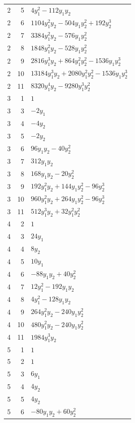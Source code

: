 \documentclass[10pt,a4paper]{article}
\begin{document}
{\begin{longtable}{rrp{125mm}}
2 & 5 & $4 y_{1}^{2} - 112 y_{1} y_{2}$\\
2 & 6 & $1104 y_{1}^{2} y_{2} - 504 y_{1} y_{2}^{2} + 192 y_{2}^{3}$\\
2 & 7 & $3384 y_{1}^{2} y_{2} - 576 y_{1} y_{2}^{2}$\\
2 & 8 & $1848 y_{1}^{2} y_{2} - 528 y_{1} y_{2}^{2}$\\
2 & 9 & $2816 y_{1}^{3} y_{2} + 864 y_{1}^{2} y_{2}^{2} - 1536 y_{1} y_{2}^{3}$\\
2 & 10 & $13184 y_{1}^{3} y_{2} + 2080 y_{1}^{2} y_{2}^{2} - 1536 y_{1} y_{2}^{3}$\\
2 & 11 & $8320 y_{1}^{4} y_{2} - 9280 y_{1}^{3} y_{2}^{2}$\\
3 & 1 & $1$\\
3 & 3 & $- 2 y_{1}$\\
3 & 4 & $- 4 y_{2}$\\
3 & 5 & $- 2 y_{2}$\\
3 & 6 & $96 y_{1} y_{2} - 40 y_{2}^{2}$\\
3 & 7 & $312 y_{1} y_{2}$\\
3 & 8 & $168 y_{1} y_{2} - 20 y_{2}^{2}$\\
3 & 9 & $192 y_{1}^{2} y_{2} + 144 y_{1} y_{2}^{2} - 96 y_{2}^{3}$\\
3 & 10 & $960 y_{1}^{2} y_{2} + 264 y_{1} y_{2}^{2} - 96 y_{2}^{3}$\\
3 & 11 & $512 y_{1}^{3} y_{2} + 32 y_{1}^{2} y_{2}^{2}$\\
4 & 2 & $1$\\
4 & 3 & $24 y_{1}$\\
4 & 4 & $8 y_{2}$\\
4 & 5 & $10 y_{1}$\\
4 & 6 & $- 88 y_{1} y_{2} + 40 y_{2}^{2}$\\
4 & 7 & $12 y_{1}^{2} - 192 y_{1} y_{2}$\\
4 & 8 & $4 y_{1}^{2} - 128 y_{1} y_{2}$\\
4 & 9 & $264 y_{1}^{2} y_{2} - 240 y_{1} y_{2}^{2}$\\
4 & 10 & $480 y_{1}^{2} y_{2} - 240 y_{1} y_{2}^{2}$\\
4 & 11 & $1984 y_{1}^{3} y_{2}$\\
5 & 1 & $1$\\
5 & 2 & $1$\\
5 & 3 & $6 y_{1}$\\
5 & 4 & $4 y_{2}$\\
5 & 5 & $4 y_{2}$\\
5 & 6 & $- 80 y_{1} y_{2} + 60 y_{2}^{2}$\\

\end{longtable}}
\end{document}
